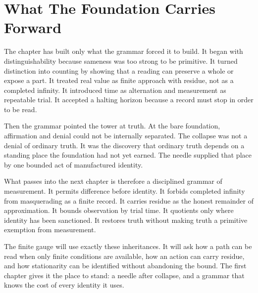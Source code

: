 \section{What The Foundation Carries Forward}

The chapter has built only what the grammar forced it to build. It
began with distinguishability because sameness was too strong to be
primitive. It turned distinction into counting by showing that a reading
can preserve a whole or expose a part. It treated real value as finite
approach with residue, not as a completed infinity. It introduced time
as alternation and measurement as repeatable trial. It accepted a
halting horizon because a record must stop in order to be read.

Then the grammar pointed the tower at truth. At the bare foundation,
affirmation and denial could not be internally separated. The collapse
was not a denial of ordinary truth. It was the discovery that ordinary
truth depends on a standing place the foundation had not yet earned. The
needle supplied that place by one bounded act of manufactured identity.

What passes into the next chapter is therefore a disciplined grammar of
measurement. It permits difference before identity. It forbids completed
infinity from masquerading as a finite record. It carries residue as the
honest remainder of approximation. It bounds observation by trial time.
It quotients only where identity has been sanctioned. It restores truth
without making truth a primitive exemption from measurement.

The finite gauge will use exactly these inheritances. It will ask how a
path can be read when only finite conditions are available, how an
action can carry residue, and how stationarity can be identified without
abandoning the bound. The first chapter gives it the place to stand: a
needle after collapse, and a grammar that knows the cost of every
identity it uses.
